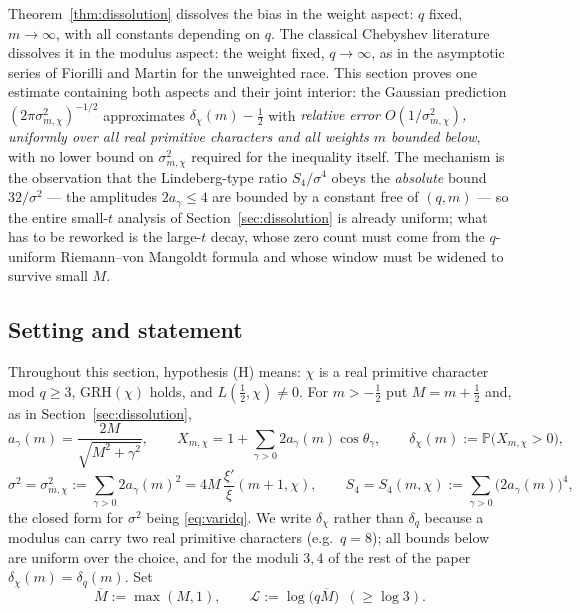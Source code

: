 \documentclass[11pt]{article}
\begin{document}
Theorem~\ref{thm:dissolution} dissolves the bias in the weight aspect:
$q$ fixed, $m\to\infty$, with all constants depending on $q$. The
classical Chebyshev literature dissolves it in the modulus aspect: the
weight fixed, $q\to\infty$, as in the asymptotic series of Fiorilli and
Martin \cite{FM13} for the unweighted race. This section proves one
estimate containing both aspects and their joint interior: the Gaussian
prediction $(2\pi\sigma_{m,\chi}^2)^{-1/2}$ approximates
$\delta_\chi(m)-\tfrac12$ with \emph{relative error
$O(1/\sigma_{m,\chi}^2)$, uniformly over all real primitive characters
and all weights $m$ bounded below}, with no lower bound on
$\sigma_{m,\chi}^2$ required for the inequality itself. The mechanism
is the observation that the Lindeberg-type ratio $S_4/\sigma^4$ obeys
the \emph{absolute} bound $32/\sigma^2$ --- the amplitudes
$2a_\gamma\le4$ are bounded by a constant free of $(q,m)$ --- so the
entire small-$t$ analysis of Section~\ref{sec:dissolution} is already
uniform; what has to be reworked is the large-$t$ decay, whose zero
count must come from the $q$-uniform Riemann--von Mangoldt formula and
whose window must be widened to survive small $M$.

\subsection*{Setting and statement}

Throughout this section, hypothesis (H) means: $\chi$ is a real
primitive character mod $q\ge3$, GRH$(\chi)$ holds, and
$L(\tfrac12,\chi)\ne0$. For $m>-\tfrac12$ put $M=m+\tfrac12$ and, as in
Section~\ref{sec:dissolution},
\[
a_\gamma(m)=\frac{2M}{\sqrt{M^2+\gamma^2}},\qquad
X_{m,\chi}=1+\sum_{\gamma>0}2a_\gamma(m)\cos\theta_\gamma,\qquad
\delta_\chi(m):=\mathbb P\bigl(X_{m,\chi}>0\bigr),
\]
\[
\sigma^2=\sigma_{m,\chi}^2:=\sum_{\gamma>0}2a_\gamma(m)^2
=4M\,\frac{\xi'}{\xi}(m+1,\chi),
\qquad
S_4=S_4(m,\chi):=\sum_{\gamma>0}\bigl(2a_\gamma(m)\bigr)^4,
\]
the closed form for $\sigma^2$ being \eqref{eq:varidq}. We write
$\delta_\chi$ rather than $\delta_q$ because a modulus can carry two
real primitive characters (e.g.\ $q=8$); all bounds below are uniform
over the choice, and for the moduli $3,4$ of the rest of the paper
$\delta_\chi(m)=\delta_q(m)$. Set
\[
\overline M:=\max(M,1),\qquad
\mathcal L:=\log\bigl(q\overline M\bigr)\;\ (\ge\log3).
\]
\end{document}
